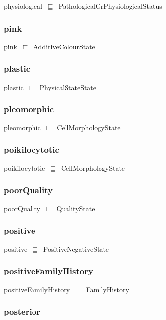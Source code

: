 \documentclass{article}
\begin{document}
physiological~\ensuremath{\sqsubseteq}~PathologicalOrPhysiologicalStatus~

\subsubsection*{pink}

pink~\ensuremath{\sqsubseteq}~AdditiveColourState~

\subsubsection*{plastic}

plastic~\ensuremath{\sqsubseteq}~PhysicalStateState~

\subsubsection*{pleomorphic}

pleomorphic~\ensuremath{\sqsubseteq}~CellMorphologyState~

\subsubsection*{poikilocytotic}

poikilocytotic~\ensuremath{\sqsubseteq}~CellMorphologyState~

\subsubsection*{poorQuality}

poorQuality~\ensuremath{\sqsubseteq}~QualityState~

\subsubsection*{positive}

positive~\ensuremath{\sqsubseteq}~PositiveNegativeState~

\subsubsection*{positiveFamilyHistory}

positiveFamilyHistory~\ensuremath{\sqsubseteq}~FamilyHistory~

\subsubsection*{posterior}
\end{document}
